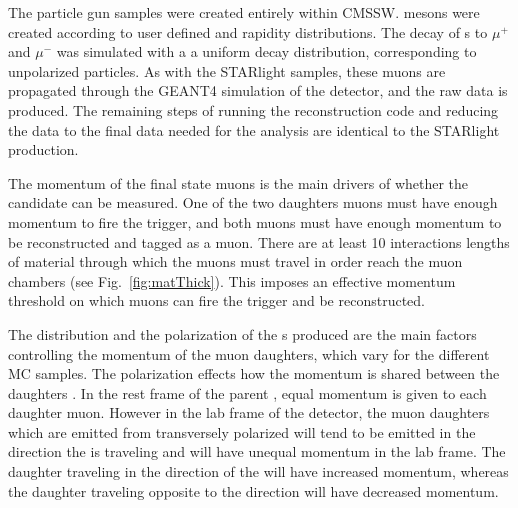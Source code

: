     The particle gun samples were created entirely within CMSSW.
    \JPsi{} mesons were created according to user defined \pt{} and rapidity
      distributions. 
    The decay of \JPsi{}s to $\mu^{+}$ and $\mu^{-}$ was simulated with a 
      a uniform decay distribution, corresponding to unpolarized \JPsi{} 
      particles.
    As with the STARlight samples, these muons are propagated through the GEANT4
      simulation of the detector, and the raw data is produced.
    The remaining steps of running the reconstruction code and reducing the 
      data to the final data needed for the analysis are identical to the 
      STARlight production.

    The momentum of the final state muons is the main drivers of whether the 
      candidate can be measured.
    One of the two daughters muons must have enough momentum to fire the 
      trigger, and both muons  must have enough momentum to be 
      reconstructed and tagged as a muon. 
    There are at least 10 interactions lengths of material through which the 
      muons must travel in order reach the muon chambers 
      (see Fig.~\ref{fig:matThick}).
    This imposes an effective momentum threshold on which muons can fire the 
      trigger and be reconstructed. 

    The \pt{} distribution and the polarization of the \JPsi{}s produced are 
      the main factors controlling the momentum of the muon daughters, which
      vary for the different MC samples. 
    The polarization effects how the momentum is shared between the daughters
      \cite{oniaPol}.
    In the rest frame of the parent \JPsi{}, equal momentum is given to each 
      daughter muon. 
    However in the lab frame of the detector, the muon daughters which are 
      emitted from transversely polarized \JPsi{} will tend to be emitted in
      the direction the \JPsi{} is traveling and will have unequal momentum in 
      the lab frame.
    The daughter traveling in the direction of the \JPsi{} will have increased
      momentum, whereas the daughter traveling opposite to the \JPsi{} 
      direction will have decreased momentum. 

